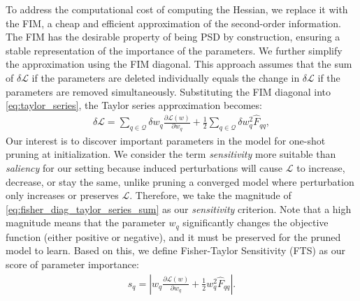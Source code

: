 To address the computational cost of computing the Hessian, we replace it with the FIM, a cheap and efficient approximation of the second-order information. The FIM has the desirable property of being PSD by construction, ensuring a stable representation of the importance of the parameters. We further simplify the approximation using the FIM diagonal. This approach assumes that the sum of $\delta \mathcal{L}$ if the parameters are deleted individually equals the change in $\delta \mathcal{L}$ if the parameters are removed simultaneously. Substituting the FIM diagonal into \eqref{eq:taylor_series}, the Taylor series approximation becomes:
\begin{align}
    \delta \mathcal{L} 
    = \sum_{q \in \mathcal{Q}} \delta w_q \frac{\partial \mathcal{L}(w)}{\partial w_q} 
    + \frac{1}{2} \sum_{q \in \mathcal{Q}} \delta w_q^2 \hat{F}_{qq},
    \label{eq:fisher_diag_taylor_series_sum}
\end{align}
Our interest is to discover important parameters in the model for one-shot pruning at initialization. We consider the term \textit{sensitivity} more suitable than \textit{saliency} for our setting because induced perturbations will cause $\mathcal{L}$ to increase, decrease, or stay the same, unlike pruning a converged model where perturbation only increases or preserves $\mathcal{L}$. Therefore, we take the magnitude of \eqref{eq:fisher_diag_taylor_series_sum} as our \textit{sensitivity} criterion. Note that a high magnitude means that the parameter $w_q$ significantly changes the objective function (either positive or negative), and it must be preserved for the pruned model to learn. Based on this, we define Fisher-Taylor Sensitivity (FTS) as our score of parameter importance:
\begin{align}
    s_q = \left| w_q \frac{\partial \mathcal{L}(w)}{\partial w_q} + \frac{1}{2} w_q^2 \hat{F}_{qq} \right|.
\end{align}

